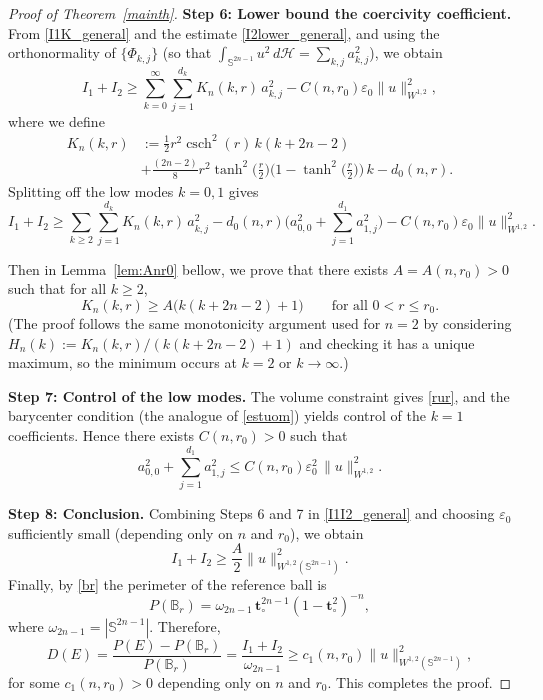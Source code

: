 \documentclass[11pt]{amsart}
\newcommand{\csch}{\operatorname{csch}}
\numberwithin{equation}{section}
\def\ge{\geqslant}
\begin{document}
\begin{proof}[Proof of Theorem~\ref{mainth}]
\medskip
\noindent\textbf{Step 6: Lower bound the coercivity coefficient.}
From \eqref{I1K_general} and the estimate \eqref{I2lower_general}, and using the orthonormality of
$\{\Phi_{k,j}\}$ (so that $\int_{\mathbb S^{2n-1}}u^2\,d\mathcal H=\sum_{k,j}a_{k,j}^2$), we obtain
\[
I_1+I_2
\ge \sum_{k=0}^\infty\sum_{j=1}^{d_k} K_n(k,r)\,a_{k,j}^2
-C(n,r_0)\varepsilon_0\|u\|_{W^{1,2}}^2,
\]
where we define
\[\begin{split}
K_n(k,r)&:=
\frac12 r^2\csch^2(r)\,k(k+2n-2)
\\&+\frac{(2n-2)}{8}r^2\tanh^2\!\Big(\frac r2\Big)\Big(1-\tanh^2\!\Big(\frac r2\Big)\Big)\,k
-d_0(n,r).\end{split}
\]
Splitting off the low modes $k=0,1$ gives
\begin{equation}\label{I1I2_general}
I_1+I_2
\ge \sum_{k\ge 2}\sum_{j=1}^{d_k} K_n(k,r)\,a_{k,j}^2
-d_0(n,r)\Big(a_{0,0}^2+\sum_{j=1}^{d_1}a_{1,j}^2\Big)
-C(n,r_0)\varepsilon_0\|u\|_{W^{1,2}}^2.
\end{equation}

Then in Lemma~\ref{lem:Anr0} bellow, we prove  that there exists $A=A(n,r_0)>0$ such that for all $k\ge 2$,
\[
K_n(k,r)\ge A\big(k(k+2n-2)+1\big)
\qquad\text{for all }0<r\le r_0.
\]
(The proof follows the same monotonicity argument used for $n=2$ by considering
$H_n(k):=K_n(k,r)/(k(k+2n-2)+1)$ and checking it has a unique maximum, so the minimum
occurs at $k=2$ or $k\to\infty$.)

\medskip
\noindent\textbf{Step 7: Control of the low modes.}
The volume constraint gives \eqref{rur}, and the barycenter condition (the analogue of \eqref{estuom})
yields control of the $k=1$ coefficients. Hence there exists $C(n,r_0)>0$ such that
\[
a_{0,0}^2+\sum_{j=1}^{d_1}a_{1,j}^2
\le C(n,r_0)\varepsilon_0^2\,\|u\|_{W^{1,2}}^2.
\]

\medskip
\noindent\textbf{Step 8: Conclusion.}
Combining Steps 6 and 7 in \eqref{I1I2_general} and choosing $\varepsilon_0$ sufficiently small
(depending only on $n$ and $r_0$), we obtain
\[
I_1+I_2 \ge \frac{A}{2}\|u\|_{W^{1,2}(\mathbb S^{2n-1})}^2.
\]
Finally, by \eqref{br} the perimeter of the reference ball is
\[
P(\mathbb B_r)
=\omega_{2n-1}\,\mathbf t_\circ^{2n-1}(1-\mathbf t_\circ^2)^{-n},
\]
where $\omega_{2n-1}=|\mathbb S^{2n-1}|$. Therefore,
\[
D(E)=\frac{P(E)-P(\mathbb B_r)}{P(\mathbb B_r)}
=\frac{I_1+I_2}{\omega_{2n-1}}
\ge c_1(n,r_0)\|u\|_{W^{1,2}(\mathbb S^{2n-1})}^2,
\]
for some $c_1(n,r_0)>0$ depending only on $n$ and $r_0$.
This completes the proof.

\end{proof}
\end{document}
